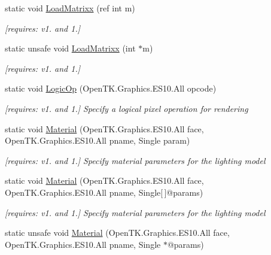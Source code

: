 \begin{DoxyCompactItemize}
static void \hyperlink{class_open_t_k_1_1_graphics_1_1_e_s10_1_1_g_l_a42f20fd92ee8b9a5899b6958e6bd3343}{Load\-Matrixx} (ref int m)
\begin{DoxyCompactList}\small\item\em \mbox{[}requires\-: v1. and 1.\mbox{]}\end{DoxyCompactList}\item 
static unsafe void \hyperlink{class_open_t_k_1_1_graphics_1_1_e_s10_1_1_g_l_ac33d2922d627c62a1fe3703b90aeadd6}{Load\-Matrixx} (int $\ast$m)
\begin{DoxyCompactList}\small\item\em \mbox{[}requires\-: v1. and 1.\mbox{]}\end{DoxyCompactList}\item 
static void \hyperlink{class_open_t_k_1_1_graphics_1_1_e_s10_1_1_g_l_a9350fa20870809ed1047e4903344e7e9}{Logic\-Op} (Open\-T\-K.\-Graphics.\-E\-S10.\-All opcode)
\begin{DoxyCompactList}\small\item\em \mbox{[}requires\-: v1. and 1.\mbox{]} Specify a logical pixel operation for rendering \end{DoxyCompactList}\item 
static void \hyperlink{class_open_t_k_1_1_graphics_1_1_e_s10_1_1_g_l_a09806de518e505fcc8ccf433efe89b62}{Material} (Open\-T\-K.\-Graphics.\-E\-S10.\-All face, Open\-T\-K.\-Graphics.\-E\-S10.\-All pname, Single param)
\begin{DoxyCompactList}\small\item\em \mbox{[}requires\-: v1. and 1.\mbox{]} Specify material parameters for the lighting model \end{DoxyCompactList}\item 
static void \hyperlink{class_open_t_k_1_1_graphics_1_1_e_s10_1_1_g_l_a6872441724df3cbaed4d77f3cde94456}{Material} (Open\-T\-K.\-Graphics.\-E\-S10.\-All face, Open\-T\-K.\-Graphics.\-E\-S10.\-All pname, Single\mbox{[}$\,$\mbox{]}@params)
\begin{DoxyCompactList}\small\item\em \mbox{[}requires\-: v1. and 1.\mbox{]} Specify material parameters for the lighting model \end{DoxyCompactList}\item 
static unsafe void \hyperlink{class_open_t_k_1_1_graphics_1_1_e_s10_1_1_g_l_a8bd5d8480ceead212ef4c2c793c48c84}{Material} (Open\-T\-K.\-Graphics.\-E\-S10.\-All face, Open\-T\-K.\-Graphics.\-E\-S10.\-All pname, Single $\ast$@params)

\end{DoxyCompactItemize}
